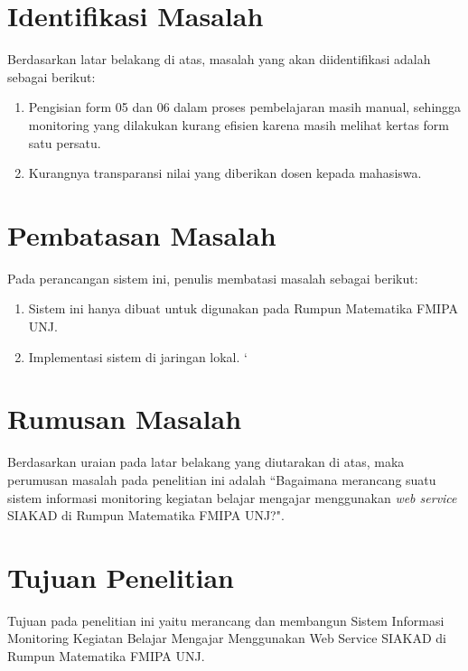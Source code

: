 	
\section{Identifikasi Masalah}
Berdasarkan latar belakang di atas, masalah yang akan diidentifikasi adalah sebagai berikut: 
\begin{enumerate}
	\item Pengisian form 05 dan 06 dalam proses pembelajaran masih manual, sehingga monitoring yang dilakukan kurang efisien karena masih melihat kertas form satu persatu.
	\item Kurangnya transparansi nilai yang diberikan dosen kepada mahasiswa.
\end{enumerate}

\section{Pembatasan Masalah}
Pada perancangan sistem ini, penulis membatasi masalah sebagai berikut:
\begin{enumerate}
	\item Sistem ini hanya dibuat untuk digunakan pada Rumpun Matematika FMIPA UNJ.
	\item Implementasi sistem di jaringan lokal.	`
\end{enumerate}

\section{Rumusan Masalah}
Berdasarkan uraian pada latar belakang yang diutarakan di atas, maka perumusan masalah pada penelitian ini adalah “Bagaimana merancang suatu sistem informasi monitoring kegiatan belajar mengajar menggunakan \textit{web service} SIAKAD di Rumpun Matematika FMIPA UNJ?".


\section{Tujuan Penelitian}
Tujuan pada penelitian ini yaitu merancang dan membangun Sistem Informasi Monitoring Kegiatan Belajar Mengajar Menggunakan Web Service SIAKAD di Rumpun Matematika FMIPA UNJ.

